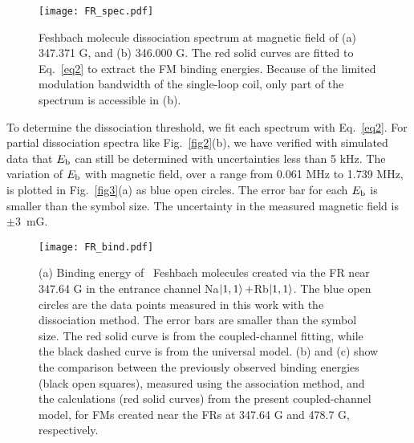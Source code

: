 \begin{figure}[t]
\begin{center}
\texttt{[image: FR\_spec.pdf]}
\end{center}
\caption[Feshbach molecule dissociation spectrum]{Feshbach molecule dissociation spectrum at magnetic field of (a) 347.371 G, and (b) 346.000 G. The red solid curves are fitted to Eq.~\ref{eq2} to extract the FM binding energies. Because of the limited modulation bandwidth of the single-loop coil, only part of the spectrum is accessible in (b).}
\label{FR_spec}
\end{figure}



To determine the dissociation threshold, we fit each spectrum with Eq.~\ref{eq2}. For partial dissociation spectra like Fig.~\ref{fig2}(b), we have verified with simulated data that $E_{\rm b}$ can still be determined with uncertainties less than 5 kHz. The variation of $E_{\rm b}$ with magnetic field, over a range from 0.061 MHz to 1.739 MHz, is plotted in Fig.~\ref{fig3}(a) as blue open circles. The error bar for each $E_{\rm b}$ is smaller than the symbol size. The uncertainty in the measured magnetic field is $\pm3$~mG. 

\begin{figure}[htbp]
\begin{center}
\texttt{[image: FR\_bind.pdf]}
\end{center}
\caption[Binding energy of \NaRb~Feshbach molecules at 347.64 G]{(a) Binding energy of \NaRb~Feshbach molecules created via the FR near 347.64 G in the entrance channel Na$\ket{1,1}+$Rb$\ket{1,1}$. The blue open circles are the data points measured in this work with the dissociation method. The error bars are smaller than the symbol size. The red solid curve is from the coupled-channel fitting, while the black dashed curve is from the universal model. (b) and (c) show the comparison between the previously observed binding energies~\cite{wang2015} (black open squares), measured using the association method, and the calculations (red solid curves) from the present coupled-channel model, for FMs created near the FRs at 347.64 G and 478.7 G, respectively.}
\label{FR_bind}
\end{figure}

